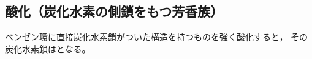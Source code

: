 \subsection{酸化（炭化水素の側鎖をもつ芳香族）}
\begin{screen}
  ベンゼン環に直接炭化水素鎖がついた構造を持つものを強く酸化すると，
  その炭化水素鎖はとなる。
\end{screen}
